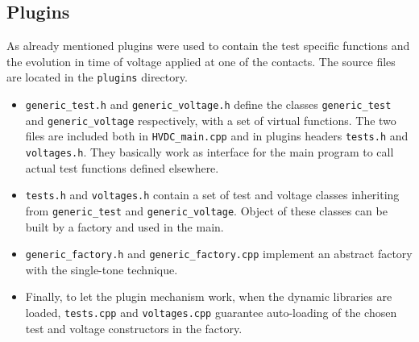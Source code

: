 \documentclass[11pt,a4paper]{article}
\begin{document}
\subsection{Plugins}
As already mentioned plugins were used to contain the test specific functions and the evolution in time of voltage applied at one of the contacts. The source files are located in the \texttt{plugins} directory. 
\begin{itemize}
	\item \texttt{generic\_test.h} and \texttt{generic\_voltage.h} define the classes \texttt{generic\_test} and \texttt{generic\_voltage} respectively, with a set of virtual functions. The two files are included both in \texttt{HVDC\_main.cpp} and in plugins headers \texttt{tests.h} and \texttt{voltages.h}. They basically work as interface for the main program to call actual test functions defined elsewhere.
	\item \texttt{tests.h} and \texttt{voltages.h} contain a set of test and voltage classes inheriting from \texttt{generic\_test} and \texttt{generic\_voltage}. Object of these classes can be built by a factory and used in the main.
	\item \texttt{generic\_factory.h} and \texttt{generic\_factory.cpp} implement an abstract factory with the single-tone technique.
	\item Finally, to let the plugin mechanism work, when the dynamic libraries are loaded, \texttt{tests.cpp} and \texttt{voltages.cpp} guarantee auto-loading of the chosen test and voltage constructors in the factory. 
\end{itemize}
\end{document}

